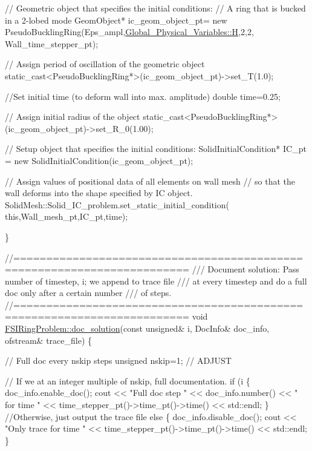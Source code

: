 \begin{DoxyCodeInclude}
 \textcolor{comment}{// Geometric object that specifies the initial conditions:}
 \textcolor{comment}{// A ring that is bucked in a 2-lobed mode}
 GeomObject* ic\_geom\_object\_pt=
  \textcolor{keyword}{new} PseudoBucklingRing(Eps\_ampl,\hyperlink{namespaceGlobal__Physical__Variables_af6e07423e22c0991084d9a2f43727805}{Global\_Physical\_Variables::H},2,2,
                         Wall\_time\_stepper\_pt); 
 
 \textcolor{comment}{// Assign period of oscillation of the geometric object}
 \textcolor{keyword}{static\_cast<}PseudoBucklingRing*\textcolor{keyword}{>}(ic\_geom\_object\_pt)->set\_T(1.0);
 
 \textcolor{comment}{//Set initial time (to deform wall into max. amplitude)}
 \textcolor{keywordtype}{double} time=0.25;
 
 \textcolor{comment}{// Assign initial radius of the object}
 \textcolor{keyword}{static\_cast<}PseudoBucklingRing*\textcolor{keyword}{>}(ic\_geom\_object\_pt)->set\_R\_0(1.00); 
 
 \textcolor{comment}{// Setup object that specifies the initial conditions:}
 SolidInitialCondition* IC\_pt = \textcolor{keyword}{new} SolidInitialCondition(ic\_geom\_object\_pt);
 
 \textcolor{comment}{// Assign values of positional data of all elements on wall mesh}
 \textcolor{comment}{// so that the wall deforms into the shape specified by IC object.}
 SolidMesh::Solid\_IC\_problem.set\_static\_initial\_condition(
  \textcolor{keyword}{this},Wall\_mesh\_pt,IC\_pt,time);
 
\}


\textcolor{comment}{//========================================================================}\textcolor{comment}{}
\textcolor{comment}{/// Document solution: Pass number of timestep, i; we append to trace file}
\textcolor{comment}{/// at every timestep and do a full doc only after a certain number}
\textcolor{comment}{/// of steps.}
\textcolor{comment}{}\textcolor{comment}{//========================================================================}
\textcolor{keywordtype}{void} \hyperlink{classFSIRingProblem_a686782b9af582b68e55c288e1fe4660e}{FSIRingProblem::doc\_solution}(\textcolor{keyword}{const} \textcolor{keywordtype}{unsigned}& i,
  DocInfo& doc\_info, ofstream& trace\_file)
\{ 

  \textcolor{comment}{// Full doc every nskip steps}
  \textcolor{keywordtype}{unsigned} nskip=1; \textcolor{comment}{// ADJUST}
  
  \textcolor{comment}{// If we at an integer multiple of nskip, full documentation.}
  \textcolor{keywordflow}{if} (i%
   \{
    doc\_info.enable\_doc();
    cout << \textcolor{stringliteral}{"Full doc step "} <<  doc\_info.number()
         << \textcolor{stringliteral}{" for time "} << time\_stepper\_pt()->time\_pt()->time() << std::endl;
   \}
  \textcolor{comment}{//Otherwise, just output the trace file}
  \textcolor{keywordflow}{else}
   \{
    doc\_info.disable\_doc();
    cout << \textcolor{stringliteral}{"Only trace for time "} 
         << time\_stepper\_pt()->time\_pt()->time() << std::endl;
   \}
  

\end{DoxyCodeInclude}
